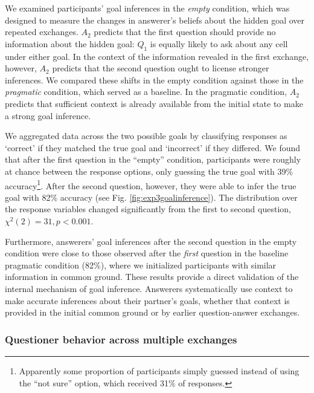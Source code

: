 \documentclass[12pt, floatsintext, jou]{apa6}
\begin{document}
We examined participants' goal inferences in the \emph{empty} condition, which was designed to measure the changes in answerer's beliefs about the hidden goal over repeated exchanges. 
$A_2$ predicts that the first question should provide no information about the hidden goal: $Q_1$ is equally likely to ask about any cell under either goal.
In the context of the information revealed in the first exchange, however, $A_2$ predicts that the second question ought to license stronger inferences.
We compared these shifts in the empty condition against those in the \emph{pragmatic} condition, which served as a baseline.
In the pragmatic condition, $A_2$ predicts that sufficient context is already available from the initial state to make a strong goal inference.

We aggregated data across the two possible goals by classifying responses as `correct' if they matched the true goal and `incorrect' if they differed.
We found that after the first question in the ``empty'' condition, participants were roughly at chance between the response options, only guessing the true goal with 39\% accuracy\footnote{Apparently some proportion of participants simply guessed instead of using the ``not sure'' option, which received 31\% of responses.}.
After the second question, however, they were able to infer the true goal with 82\% accuracy (see Fig. \ref{fig:exp3goalinference}).
The distribution over the response variables changed significantly from the first to second question, $\chi^2(2) = 31, p < 0.001$.

Furthermore, answerers' goal inferences after the second question in the empty condition were close to those observed after the \emph{first} question in the baseline pragmatic condition (82\%), where we initialized participants with similar information in common ground.
These results provide a direct validation of the internal mechanism of goal inference.
Answerers systematically use context to make accurate inferences about their partner's goals, whether that context is provided in the initial common ground or by earlier question-answer exchanges.

\subsubsection{Questioner behavior across multiple exchanges}
\end{document}
